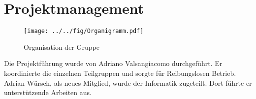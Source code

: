 \section{Projektmanagement}

\begin{figure}[h!]
	\centering
	\texttt{[image: ../../fig/Organigramm.pdf]}
	\caption{Organisation der Gruppe}
	\label{fig:Organigramm}
\end{figure}

\noindent
Die Projektführung wurde von Adriano Valsangiacomo durchgeführt. Er
koordinierte die einzelnen Teilgruppen und sorgte für Reibungslosen
Betrieb. Adrian Würsch, als neues Mitglied, wurde der Informatik
zugeteilt. Dort führte er unterstützende Arbeiten aus.


\newpage

\newpage

\newpage
